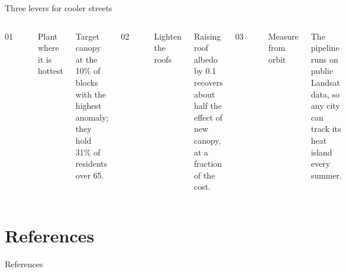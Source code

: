 \documentclass[aspectratio=169,10pt]{beamer}
\begin{document}
\begin{frame}{Three levers for cooler streets}
  \vspace{4mm}
  \begin{columns}[T,onlytextwidth]
      {\ttfamily\small\color{lsAccent}01\par}\vspace{1mm}\rule{\linewidth}{0.4pt}\par\vspace{2mm}
      {\lssemibold Plant where it is hottest\par}\vspace{1mm}
      {\footnotesize Target canopy at the 10\% of blocks with the highest anomaly; they
      hold 31\% of residents over 65.\par}
      {\ttfamily\small\color{lsAccent}02\par}\vspace{1mm}\rule{\linewidth}{0.4pt}\par\vspace{2mm}
      {\lssemibold Lighten the roofs\par}\vspace{1mm}
      {\footnotesize Raising roof albedo by 0.1 recovers about half the effect of new
      canopy, at a fraction of the cost.\par}
      {\ttfamily\small\color{lsAccent}03\par}\vspace{1mm}\rule{\linewidth}{0.4pt}\par\vspace{2mm}
      {\lssemibold Measure from orbit\par}\vspace{1mm}
      {\footnotesize The pipeline runs on public Landsat data, so any city can track its
      heat island every summer.\par}
  \end{columns}
\end{frame}

\section*{References}

\begin{frame}{References}
  \printbibliography[heading=none]
\end{frame}
\end{document}
